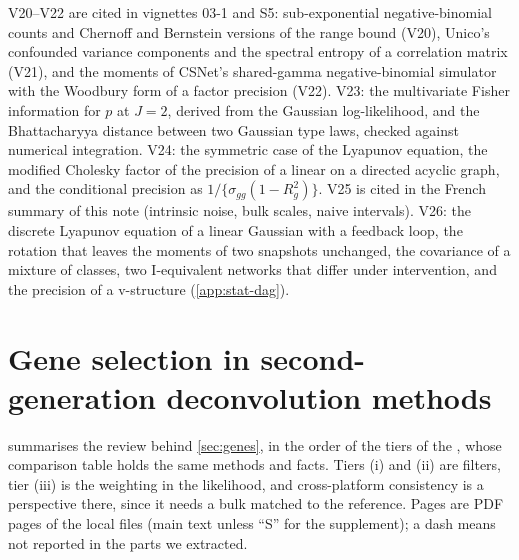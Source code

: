 \documentclass[11pt,a4paper]{article}
\begin{document}
V20--V22 are cited in vignettes 03-1 and S5: sub-exponential negative-binomial counts and Chernoff and Bernstein
versions of the range bound (V20), Unico's confounded variance components and the spectral entropy of a
correlation matrix (V21), and the moments of CSNet's shared-gamma negative-binomial simulator with the Woodbury
form of a factor precision (V22). V23: the multivariate Fisher information for $p$ at $J=2$, derived from the
Gaussian log-likelihood, and the Bhattacharyya distance between two Gaussian type laws, checked against numerical
integration. V24: the symmetric case of the Lyapunov equation, the modified Cholesky factor of the precision of a
linear  on a directed acyclic graph, and the conditional precision as $1/\{\sigma_{gg}(1-R^2_g)\}$. V25 is cited in the French summary of this note (intrinsic noise, bulk scales, naive intervals). V26: the
discrete Lyapunov equation of a linear Gaussian  with a feedback loop, the rotation that leaves
the moments of two snapshots unchanged, the covariance of a mixture of classes, two I-equivalent networks that
differ under intervention, and the precision of a v-structure (\cref{app:stat-dag}).


\clearpage
\section{Gene selection in second-generation deconvolution methods}\label{app:review}

 summarises the review behind \cref{sec:genes}, in the order of the tiers of the
, whose comparison table holds the same
methods and facts. Tiers (i) and (ii) are filters, tier (iii) is the weighting in the likelihood, and
cross-platform consistency is a perspective there, since it needs a bulk matched to the reference. Pages are
PDF pages of the local files (main text unless \enquote{S} for the supplement); a dash means not reported in
the parts we extracted.
\end{document}
